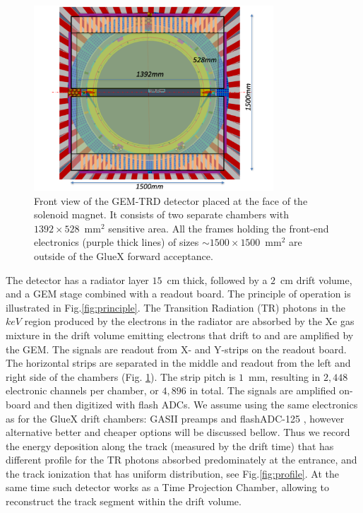 \documentclass[%
preprint,
nofootinbib,
 amsmath,amssymb,
 aps,
floatfix,
]{revtex4-1}
\begin{document}
\begin{figure}[]
\includegraphics[width=0.80\textwidth]{./fig/GEM_TRD_full.pdf}
  \caption{
Front view of the GEM-TRD detector placed at the face of the solenoid
magnet. It consists of two separate chambers with $1392 \times 528$~mm$^2$
sensitive area. All the frames holding the front-end electronics
(purple thick lines) 
of sizes $\sim 1500 \times 1500$~mm$^2$
are outside of the GlueX forward acceptance.
}
  \label{fig:front_view}
\end{figure}

The detector has a radiator layer $15$~cm thick, followed 
by a $2$~cm drift volume, and a GEM stage combined with a readout board.
The principle of operation is illustrated in Fig.\ref{fig:principle}.
The Transition Radiation (TR) photons in the $keV$ region produced by the 
electrons in the radiator are absorbed by the Xe gas mixture in the drift volume
emitting electrons that drift to and are amplified by the GEM. 
The signals are readout from  X- and Y-strips on the readout board.
The horizontal strips are separated in the middle and readout 
from the left and right side of the chambers (Fig. \ref{fig:front_view}).
The strip pitch is $1$~mm, resulting in $2,448$ electronic channels
per chamber, or $4,896$ in total.
The signals are amplified on-board and then digitized with flash ADCs.
We assume using the same  electronics as for the GlueX drift chambers: 
GASII \cite{GASII} preamps and flashADC-125 \cite{fADC125},
however alternative better and cheaper options will be discussed bellow.
Thus we record the energy deposition along the track 
(measured by the drift time)
that has different profile for the TR photons
absorbed predominately at the entrance, and the track ionization 
that has uniform distribution, see Fig.\ref{fig:profile}. 
At the same time such detector works as a Time Projection Chamber,
allowing to reconstruct the track segment within the drift volume.
\end{document}
